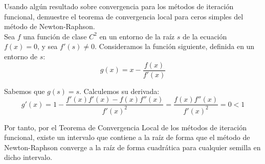 \begin{ejercicio}\label{ej:1.1.6}
    Usando algún resultado sobre convergencia para los métodos de iteración funcional, demuestre el teorema de convergencia local para ceros simples del método de Newton-Raphson.\\

    Sea $f$ una función de clase $C^2$ en un entorno de la raíz $s$ de la ecuación $f(x)=0$, y sea $f'(s)\neq 0$. Consideramos la función siguiente, definida en un entorno de $s$:
    \begin{equation*}
        g(x)=x-\frac{f(x)}{f'(x)}
    \end{equation*}

    Sabemos que $g(s)=s$. Calculemos su derivada:
    \begin{equation*}
        g'(x)=1-\frac{f'(x)f'(x)-f(x)f''(x)}{f'(x)^2}=\frac{f(x)f''(x)}{f'(x)^2}=0<1
    \end{equation*}

    Por tanto, por el Teorema de Convergencia Local de los métodos de iteración funcional, existe un intervalo que contiene a la raíz de forma que el método de Newton-Raphson converge a la raíz de forma cuadrática para cualquier semilla en dicho intervalo.
\end{ejercicio}

